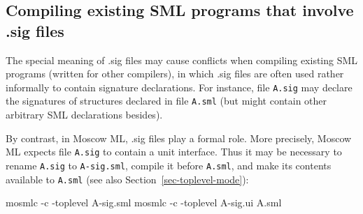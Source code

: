 \documentclass[fleqn,a4paper]{article}
\begin{document}
\subsection{Compiling existing SML programs that involve .sig files}

The special meaning of .sig files may cause conflicts when compiling
existing SML programs (written for other compilers),
in which .sig files are often used rather
informally to contain signature declarations.  For instance, file
\texttt{A.sig} may declare the signatures of structures declared in
file \texttt{A.sml} (but might contain other arbitrary SML
declarations besides).

By contrast, in Moscow ML, .sig files play a formal role.  More
precisely, Moscow ML expects file \texttt{A.sig} to contain a unit
interface.  Thus it may be necessary to rename \texttt{A.sig} to
\texttt{A-sig.sml}, compile it before \texttt{A.sml}, and make its
contents available to \texttt{A.sml} (see also
Section~\ref{sec-toplevel-mode}):

\begin{program}
mosmlc -c -toplevel A-sig.sml
mosmlc -c -toplevel A-sig.ui A.sml
\end{program}






\end{document}
